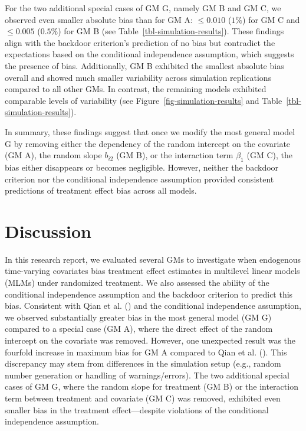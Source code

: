 \documentclass[
  11pt,
  a4paper,
]{article}
\begin{document}
For the two additional special cases of GM G, namely GM B and GM C, we
observed even smaller absolute bias than for GM A: \(\leq 0.010\)
(\(1\%\)) for GM C and \(\leq 0.005\) (\(0.5\%\)) for GM B (see
Table~\ref{tbl-simulation-results}). These findings align with the
backdoor criterion's prediction of no bias but contradict the
expectations based on the conditional independence assumption, which
suggests the presence of bias. Additionally, GM B exhibited the smallest
absolute bias overall and showed much smaller variability across
simulation replications compared to all other GMs. In contrast, the
remaining models exhibited comparable levels of variability (see
Figure~\ref{fig-simulation-results} and
Table~\ref{tbl-simulation-results}).

In summary, these findings suggest that once we modify the most general
model G by removing either the dependency of the random intercept on the
covariate (GM A), the random slope \(b_{i2}\) (GM B), or the interaction
term \(\beta_1\) (GM C), the bias either disappears or becomes
negligible. However, neither the backdoor criterion nor the conditional
independence assumption provided consistent predictions of treatment
effect bias across all models.

\section{Discussion}\label{discussion}

In this research report, we evaluated several GMs to investigate when
endogenous time-varying covariates bias treatment effect estimates in
multilevel linear models (MLMs) under randomized treatment. We also
assessed the ability of the conditional independence assumption and the
backdoor criterion to predict this bias. Consistent with Qian et al.
() and the conditional independence
assumption, we observed substantially greater bias in the most general
model (GM G) compared to a special case (GM A), where the direct effect
of the random intercept on the covariate was removed. However, one
unexpected result was the fourfold increase in maximum bias for GM A
compared to Qian et al. (). This
discrepancy may stem from differences in the simulation setup (e.g.,
random number generation or handling of warnings/errors). The two
additional special cases of GM G, where the random slope for treatment
(GM B) or the interaction term between treatment and covariate (GM C)
was removed, exhibited even smaller bias in the treatment
effect---despite violations of the conditional independence assumption.
\end{document}
